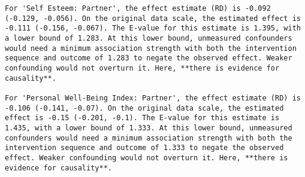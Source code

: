 \documentclass[
  singlecolumn]{article}
\begin{document}
\begin{verbatim}
For 'Self Esteem: Partner', the effect estimate (RD) is -0.092 (-0.129, -0.056). On the original data scale, the estimated effect is -0.111 (-0.156, -0.067). The E-value for this estimate is 1.395, with a lower bound of 1.283. At this lower bound, unmeasured confounders would need a minimum association strength with both the intervention sequence and outcome of 1.283 to negate the observed effect. Weaker confounding would not overturn it. Here, **there is evidence for causality**.

For 'Personal Well-Being Index: Partner', the effect estimate (RD) is -0.106 (-0.141, -0.07). On the original data scale, the estimated effect is -0.15 (-0.201, -0.1). The E-value for this estimate is 1.435, with a lower bound of 1.333. At this lower bound, unmeasured confounders would need a minimum association strength with both the intervention sequence and outcome of 1.333 to negate the observed effect. Weaker confounding would not overturn it. Here, **there is evidence for causality**.
\end{verbatim}
\end{document}

